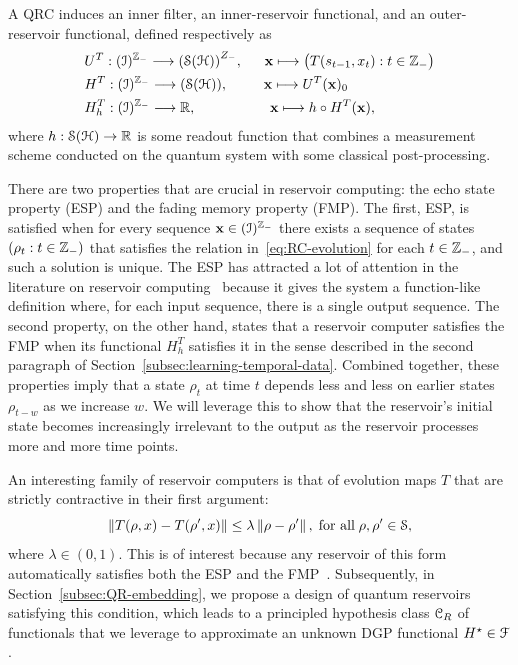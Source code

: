 A QRC induces an inner filter, an inner-reservoir functional, and an outer-reservoir functional, defined respectively as
\begin{equation} \begin{aligned} 
    &U^T: ({\mathcal{I}})^{{\mathbb{Z}}_-} \longrightarrow {({\mathcal{S}}({\mathcal{H}}))}^{Z_-}, \quad \;\; {\mathbf{x}} \longmapsto \big(T(s_{t-1}, x_{t}): t \in {\mathbb{Z}}_- \big)\\ 
    &H^T: ({\mathcal{I}})^{{\mathbb{Z}}_-} \longrightarrow ({\mathcal{S}}({\mathcal{H}})), \qquad \;\; {\mathbf{x}} \longmapsto U^T({\mathbf{x}})_0\\ &H_h^T: ({\mathcal{I}})^{{\mathbb{Z}}_-} \longrightarrow {\mathbb{R}}, \qquad\quad\quad\quad \; {\mathbf{x}} \longmapsto h \circ H^T({\mathbf{x}}), 
\end{aligned} 
\end{equation}
where $h: {\mathcal{S}}({\mathcal{H}}) \to {\mathbb{R}}$ is some readout function that combines a measurement scheme conducted on the quantum system with some classical post-processing.

There are two properties that are crucial in reservoir computing: the echo state property (ESP) and the fading memory property (FMP). The first, ESP, is satisfied when for every sequence ${\mathbf{x}} \in ({\mathcal{I}})^{{\mathbb{Z}}_-}$ there exists a sequence of states $(\rho_t: t \in {\mathbb{Z}}_-)$ that satisfies the relation in~\cref{eq:RC-evolution} for each $t \in {\mathbb{Z}}_-$, and such a solution is unique. The ESP has attracted a lot of attention in the literature on reservoir computing~\cite{Jaeger_2001_EchoState_GMD148} because it gives the system a function-like definition where, for each input sequence, there is a single output sequence. The second property, on the other hand, states that a reservoir computer satisfies the FMP when its functional $H^T_h$ satisfies it in the sense described in the second paragraph of Section~\ref{subsec:learning-temporal-data}. Combined together, these properties imply that a state $\rho_t$ at time $t$ depends less and less on earlier states $\rho_{t-w}$ as we increase $w$. We will leverage this to show that the reservoir's initial state becomes increasingly irrelevant to the output as the reservoir processes more and more time points.


An interesting family of reservoir computers is that of evolution maps $T$ that are strictly contractive in their first argument:
\begin{equation}\label{eq:contraction}
    \left\lVert T(\rho, x) - T(\rho', x)\right\rVert \leq \lambda \left\lVert\rho - \rho'\right\rVert, \; \text{for all} \; \rho, \rho' \in {\mathcal{S}},
\end{equation}
where $\lambda \in (0,1)$. This is of interest because any reservoir of this form automatically satisfies both the ESP and the FMP~\cite{Monzani_Prati_2025, Grigoryeva_Ortega_2018}. Subsequently, in Section~\ref{subsec:QR-embedding}, we propose a design of quantum reservoirs satisfying this condition, which leads to a principled hypothesis class ${\mathcal{C}}_R$ of functionals that we leverage to approximate an unknown DGP functional $H^\star \in {\mathcal{F}}$.